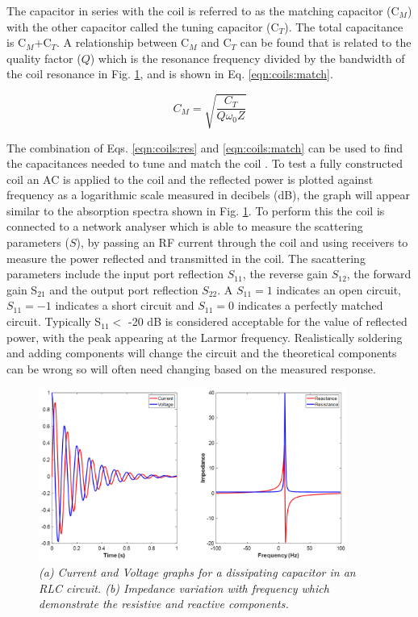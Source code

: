 The capacitor in series with the coil is referred to as the matching capacitor (C$_M$) with the other capacitor called the tuning capacitor (C$_T$). The total capacitance is C$_M$+C$_T$. A relationship between C$_M$ and C$_T$ can be found that is related to the quality factor ($Q$) \cite{Chen1989ChapterNoise} which is the resonance frequency divided by the bandwidth of the coil resonance in Fig. \ref{fig:coils:VI}, and is shown in Eq. \ref{eqn:coils:match}. 

\begin{equation}
    C_M = \sqrt{\frac{C_T}{Q\omega_0Z}}
    \label{eqn:coils:match}
\end{equation}

The combination of Eqs. \ref{eqn:coils:res} and \ref{eqn:coils:match} can be used to find the capacitances needed to tune and match the coil \cite{Chen1989ChapterNoise}. To test a fully constructed coil an \ac{AC} is applied to the coil and the reflected power is plotted against frequency as a logarithmic scale measured in decibels (dB), the graph will appear similar to the absorption spectra shown in Fig. \ref{fig:coils:VI}. To perform this the coil is connected to a network analyser which is able to measure the scattering parameters ($S$), by passing an \ac{RF} current through the coil and using receivers to measure the power reflected and transmitted in the coil. The sacattering parameters include the input port reflection $S_{11}$, the reverse gain $S_{12}$, the forward gain S$_{21}$ and the output port reflection $S_{22}$. A $S_{11} = 1$ indicates an open circuit, $S_{11} = -1$ indicates a short circuit and $S_{11} = 0$ indicates a perfectly matched circuit. Typically S$_11 <$ -20 dB is considered acceptable for the value of reflected power, with the peak appearing at the Larmor frequency. Realistically soldering and adding components will change the circuit and the theoretical components can be wrong so will often need changing based on the measured response.

\begin{figure}
    \centering
    \includegraphics[width=0.9\textwidth]{Figures/Coils/VI.png}
    \caption{\textit{(a) Current and Voltage graphs for a dissipating capacitor in an RLC circuit. (b) Impedance variation with frequency which demonstrate the resistive and reactive components.}}
    \label{fig:coils:VI}
\end{figure}

